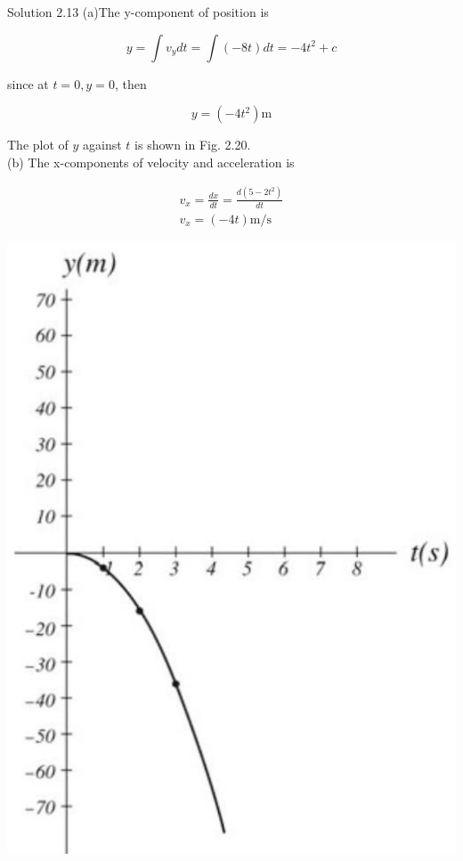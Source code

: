 \documentclass[10pt]{article}
\begin{document}
Solution 2.13 (a)The y-component of position is

$$
y=\int v_{y} d t=\int(-8 t) d t=-4 t^{2}+c
$$

since at $t=0, y=0$, then

$$
y=\left(-4 t^{2}\right) \mathrm{m}
$$

The plot of $y$ against $t$ is shown in Fig. 2.20.\\
(b) The x-components of velocity and acceleration is

$$
\begin{gathered}
v_{x}=\frac{d x}{d t}=\frac{d\left(5-2 t^{2}\right)}{d t} \\
v_{x}=(-4 t) \mathrm{m} / \mathrm{s}
\end{gathered}
$$

\begin{center}
\includegraphics[max width=\textwidth]{2024_09_13_db1f357d2aad0a03eb2eg-037}
\end{center}
\end{document}
